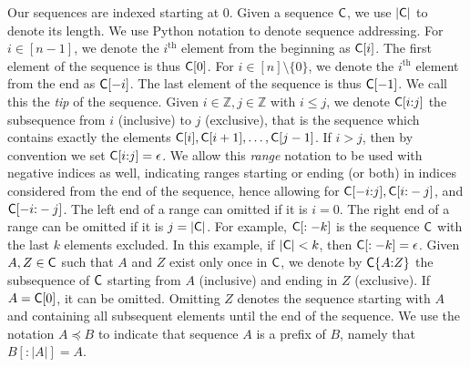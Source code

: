 Our sequences are indexed starting at $0$. Given a sequence $\mathsf{C}$, we use
$|\mathsf{C}|$ to denote its length. We use Python notation to denote sequence
addressing. For $i \in [n - 1]$, we denote the $i^\text{th}$ element from the
beginning as $\mathsf{C}[i]$. The first element of the sequence is thus $\mathsf{C}[0]$.
For $i \in [n] \setminus \{0\}$, we denote the $i^\text{th}$ element from the
end as $\mathsf{C}[-i]$. The last element of the sequence is thus $\mathsf{C}[-1]$. We
call this the \emph{tip} of the sequence. Given $i \in \mathbb{Z},
j \in \mathbb{Z}$ with $i \leq j$, we denote $\mathsf{C}[i{:}j]$ the subsequence from
$i$ (inclusive) to $j$ (exclusive), that is the sequence which contains exactly
the elements $\mathsf{C}[i], \mathsf{C}[i + 1], \dots, \mathsf{C}[j - 1]$. If $i > j$, then
by convention we set $\mathsf{C}[i{:}j] = \epsilon$. We allow this \emph{range}
notation to be used with negative indices as well, indicating ranges starting or
ending (or both) in indices considered from the end of the sequence, hence
allowing for $\mathsf{C}[-i{:}j], \mathsf{C}[i{:}-j]$, and $\mathsf{C}[-i{:}-j]$. The left end of
a range can omitted if it is $i = 0$. The right end of a range can be omitted if
it is $j = |\mathsf{C}|$. For example, $\mathsf{C}[:-k]$ is the sequence $\mathsf{C}$ with
the last $k$ elements excluded. In this example, if $|\mathsf{C}| < k$, then
$\mathsf{C}[:-k] = \epsilon$.
Given $A, Z \in \mathsf{C}$ such that $A$ and $Z$ exist only once in
$\mathsf{C}$, we denote by $\mathsf{C}\{A{:}Z\}$ the subsequence of $\mathsf{C}$ starting from
$A$ (inclusive) and ending in $Z$ (exclusive). If $A = \mathsf{C}[0]$, it can be
omitted. Omitting $Z$ denotes the sequence starting with $A$ and containing all
subsequent elements until the end of the sequence.
We use the notation $A \preceq B$ to indicate that sequence $A$ is a prefix of
$B$, namely that $B[{:}|A|] = A$.

